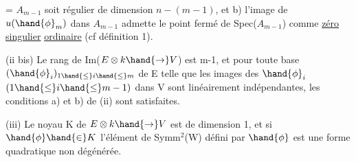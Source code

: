 \placedmargin{\unsure{$\diagup$}}

= $A_{m-1}$
soit  régulier de dimension $n-(m-1)$, et b) l'image de $u(\hand{\phi}_m)$
dans $A_{m-1}$ admette le point fermé de Spec($A_{m-1}$) comme \uline{zéro singulier}
\uline{ordinaire} (cf définition 1).

(ii bis)  Le rang de Im($E\otimes k \hand{\to} V$) est m-1, et pour
toute base $(\hand{\phi}_i)_{1\hand{\leq} i\hand{\leq} m}$ de E telle que les images des $\hand{\phi}_i$ $(1\hand{\leq} i\hand{\leq} m-1)$ dans V
sont linéairement indépendantes, les conditions a) et b) de (ii) sont
satisfaites.

(iii) Le noyau  K de $E\otimes k \hand{\to} V$ est de dimension 1, et si $\hand{\phi}\hand{\in} K$
 l'élément de Symm$^2$(W) défini par $\hand{\phi}$ est une forme quadratique
non dégénérée.

